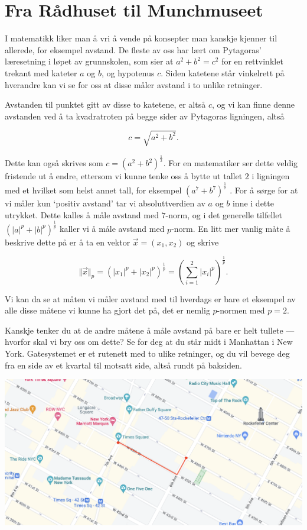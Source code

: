 \section*{Fra Rådhuset til Munchmuseet}

I matematikk liker man å vri å vende på konsepter man kanskje kjenner til allerede, for eksempel avstand. De fleste av oss har lært om Pytagoras’ læresetning i løpet av grunnskolen, som sier at $a^2+b^2=c^2$ for en rettvinklet trekant med kateter $a$ og $b$, og hypotenus $c$. Siden katetene står vinkelrett på hverandre kan vi se for oss at disse måler avstand i to unlike retninger.

Avstanden til punktet gitt av disse to katetene, er altså $c$, og vi kan finne denne avstanden ved å ta kvadratroten på begge sider av Pytagoras ligningen, altså 

$$
c = \sqrt{a^2+b^2}.
$$

Dette kan også skrives som $c = (a^2+b^2)^{\frac{1}{2}}$. For en matematiker ser dette veldig fristende ut å endre, ettersom vi kunne tenke oss å bytte ut tallet $2$ i ligningen med et hvilket som helst annet tall, for eksempel $(a^7+b^7)^{\frac{1}{7}}$ . For å sørge for at vi måler kun ‘positiv avstand’ tar vi absoluttverdien av $a$ og $b$ inne i dette utrykket. Dette kalles å måle avstand med $7$-norm, og i det generelle tilfellet $(|a|^p+|b|^p)^{\frac{1}{p}}$ kaller vi å måle avstand med $p$-norm. En litt mer vanlig måte å beskrive dette på er å ta en vektor $\vec x = (x_1, x_2)$ og skrive

$$
\Vert \vec x \Vert_p = (|x_1|^p+|x_2|^p)^{\frac{1}{p}} = \left(\sum_{i=1}^2 |x_i|^p\right)^{\frac{1}{p}}.
$$

Vi kan da se at måten vi måler avstand med til hverdags er bare et eksempel av alle disse måtene vi kunne ha gjort det på, det er nemlig $p$-normen med $p=2$. 

Kanskje tenker du at de andre måtene å måle avstand på bare er helt tullete — hvorfor skal vi bry oss om dette? Se for deg at du står midt i Manhattan i New York. Gatesystemet er et rutenett med to ulike retninger, og du vil bevege deg fra en side av et kvartal til motsatt side, altså rundt på baksiden. 

\begin{center}
    \includegraphics[width=\textwidth]{img/manhattan.png}
\end{center}

